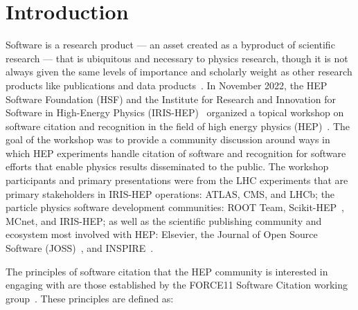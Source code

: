 \section{Introduction}\label{sec:introduction}
Software is a research product --- an asset created as a byproduct of scientific research --- that is ubiquitous and necessary to physics research, though it is not always given the same levels of importance and scholarly weight as other research products like publications and data products~\cite{Cranmer:2021urp}.
In November 2022, the HEP Software Foundation (HSF) and the Institute for Research and Innovation for Software in High-Energy Physics (IRIS-HEP)~\cite{S2I2HEPSP,IRISHEPWEB} organized a topical workshop on software citation and recognition in the field of high energy physics (HEP)~\cite{software_citation_workshop_report,software_citation_indico}.
The goal of the workshop was to provide a community discussion around ways in which HEP experiments handle citation of software and recognition for software efforts that enable physics results disseminated to the public.
The workshop participants and primary presentations were from the LHC experiments that are primary stakeholders in IRIS-HEP operations: ATLAS, CMS, and LHCb; the particle physics software development communities: ROOT Team, Scikit-HEP~\cite{Rodrigues:2020syo}, MCnet, and IRIS-HEP; as well as the scientific publishing community and ecosystem most involved with HEP: Elsevier, the Journal of Open Source Software (JOSS)~\cite{smith_journal_2018}, and INSPIRE~\cite{INSPIRE}.

The principles of software citation that the HEP community is interested in engaging with are those established by the FORCE11 Software Citation working group~\cite{smith_software_2016}.
These principles are defined as:

